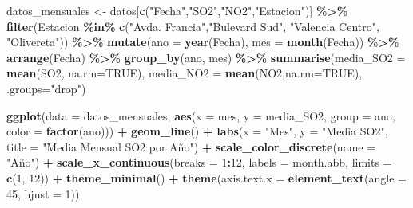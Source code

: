\documentclass[notspecified,article,submit,moreauthors,pdftex]{Definitions/mdpi}
\newenvironment{Shaded}{\begin{snugshade}}{\end{snugshade}}
\newcommand{\AttributeTok}[1]{\textcolor[rgb]{0.13,0.29,0.53}{#1}}
\newcommand{\ConstantTok}[1]{\textcolor[rgb]{0.56,0.35,0.01}{#1}}
\newcommand{\DecValTok}[1]{\textcolor[rgb]{0.00,0.00,0.81}{#1}}
\newcommand{\FunctionTok}[1]{\textcolor[rgb]{0.13,0.29,0.53}{\textbf{#1}}}
\newcommand{\NormalTok}[1]{#1}
\newcommand{\OtherTok}[1]{\textcolor[rgb]{0.56,0.35,0.01}{#1}}
\newcommand{\SpecialCharTok}[1]{\textcolor[rgb]{0.81,0.36,0.00}{\textbf{#1}}}
\newcommand{\StringTok}[1]{\textcolor[rgb]{0.31,0.60,0.02}{#1}}
\begin{document}
\begin{Shaded}
\begin{Highlighting}[]
\NormalTok{datos\_mensuales }\OtherTok{\textless{}{-}}\NormalTok{ datos[}\FunctionTok{c}\NormalTok{(}\StringTok{"Fecha"}\NormalTok{,}\StringTok{"SO2"}\NormalTok{,}\StringTok{"NO2"}\NormalTok{,}\StringTok{"Estacion"}\NormalTok{)] }\SpecialCharTok{\%\textgreater{}\%}
  \FunctionTok{filter}\NormalTok{(Estacion }\SpecialCharTok{\%in\%} \FunctionTok{c}\NormalTok{(}\StringTok{"Avda. Francia"}\NormalTok{,}\StringTok{"Bulevard Sud"}\NormalTok{, }\StringTok{"Valencia Centro"}\NormalTok{, }\StringTok{"Olivereta"}\NormalTok{)) }\SpecialCharTok{\%\textgreater{}\%}
  \FunctionTok{mutate}\NormalTok{(}\AttributeTok{ano =} \FunctionTok{year}\NormalTok{(Fecha), }\AttributeTok{mes =} \FunctionTok{month}\NormalTok{(Fecha)) }\SpecialCharTok{\%\textgreater{}\%}
  \FunctionTok{arrange}\NormalTok{(Fecha) }\SpecialCharTok{\%\textgreater{}\%}
  \FunctionTok{group\_by}\NormalTok{(ano, mes) }\SpecialCharTok{\%\textgreater{}\%}
  \FunctionTok{summarise}\NormalTok{(}\AttributeTok{media\_SO2 =} \FunctionTok{mean}\NormalTok{(SO2, }\AttributeTok{na.rm=}\ConstantTok{TRUE}\NormalTok{), }\AttributeTok{media\_NO2 =} \FunctionTok{mean}\NormalTok{(NO2,}\AttributeTok{na.rm=}\ConstantTok{TRUE}\NormalTok{), }\AttributeTok{.groups=}\StringTok{"drop"}\NormalTok{)}

\FunctionTok{ggplot}\NormalTok{(}\AttributeTok{data =}\NormalTok{ datos\_mensuales, }\FunctionTok{aes}\NormalTok{(}\AttributeTok{x =}\NormalTok{ mes, }\AttributeTok{y =}\NormalTok{ media\_SO2, }\AttributeTok{group =}\NormalTok{ ano, }\AttributeTok{color =} \FunctionTok{factor}\NormalTok{(ano))) }\SpecialCharTok{+}
  \FunctionTok{geom\_line}\NormalTok{() }\SpecialCharTok{+}
  \FunctionTok{labs}\NormalTok{(}\AttributeTok{x =} \StringTok{"Mes"}\NormalTok{, }\AttributeTok{y =} \StringTok{"Media SO2"}\NormalTok{, }\AttributeTok{title =} \StringTok{"Media Mensual SO2 por Año"}\NormalTok{) }\SpecialCharTok{+}
  \FunctionTok{scale\_color\_discrete}\NormalTok{(}\AttributeTok{name =} \StringTok{"Año"}\NormalTok{) }\SpecialCharTok{+}
  \FunctionTok{scale\_x\_continuous}\NormalTok{(}\AttributeTok{breaks =} \DecValTok{1}\SpecialCharTok{:}\DecValTok{12}\NormalTok{, }\AttributeTok{labels =}\NormalTok{ month.abb, }\AttributeTok{limits =} \FunctionTok{c}\NormalTok{(}\DecValTok{1}\NormalTok{, }\DecValTok{12}\NormalTok{)) }\SpecialCharTok{+}
  \FunctionTok{theme\_minimal}\NormalTok{() }\SpecialCharTok{+}
  \FunctionTok{theme}\NormalTok{(}\AttributeTok{axis.text.x =} \FunctionTok{element\_text}\NormalTok{(}\AttributeTok{angle =} \DecValTok{45}\NormalTok{, }\AttributeTok{hjust =} \DecValTok{1}\NormalTok{))}
\end{Highlighting}
\end{Shaded}
\end{document}
